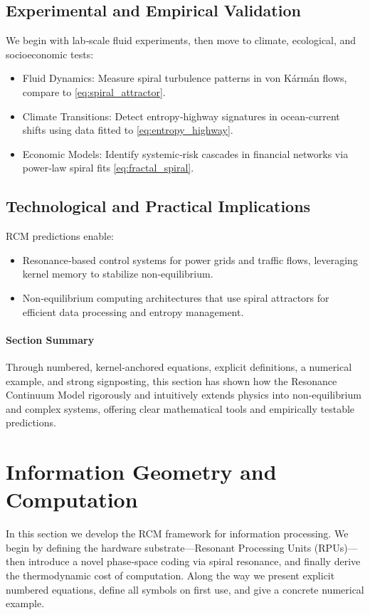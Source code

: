 \subsection{Experimental and Empirical Validation}
We begin with lab‐scale fluid experiments, then move to climate, ecological, and socioeconomic tests:
\begin{itemize}
  \item Fluid Dynamics: Measure spiral turbulence patterns in von Kármán flows, compare to \eqref{eq:spiral_attractor}.
  \item Climate Transitions: Detect entropy‐highway signatures in ocean‐current shifts using data fitted to \eqref{eq:entropy_highway}.
  \item Economic Models: Identify systemic‐risk cascades in financial networks via power‐law spiral fits \eqref{eq:fractal_spiral}.
\end{itemize}

\subsection{Technological and Practical Implications}
RCM predictions enable:
\begin{itemize}
  \item Resonance‐based control systems for power grids and traffic flows, leveraging kernel memory to stabilize non‐equilibrium.
  \item Non‐equilibrium computing architectures that use spiral attractors for efficient data processing and entropy management.
\end{itemize}

\paragraph{Section Summary}
Through numbered, kernel‐anchored equations, explicit definitions, a numerical example, and strong signposting, this section has shown how the Resonance Continuum Model rigorously and intuitively extends physics into non‐equilibrium and complex systems, offering clear mathematical tools and empirically testable predictions.


\section{Information Geometry and Computation}

In this section we develop the RCM framework for information processing.  We begin by defining the hardware substrate—Resonant Processing Units (RPUs)—then introduce a novel phase‐space coding via spiral resonance, and finally derive the thermodynamic cost of computation.  Along the way we present explicit numbered equations, define all symbols on first use, and give a concrete numerical example.

